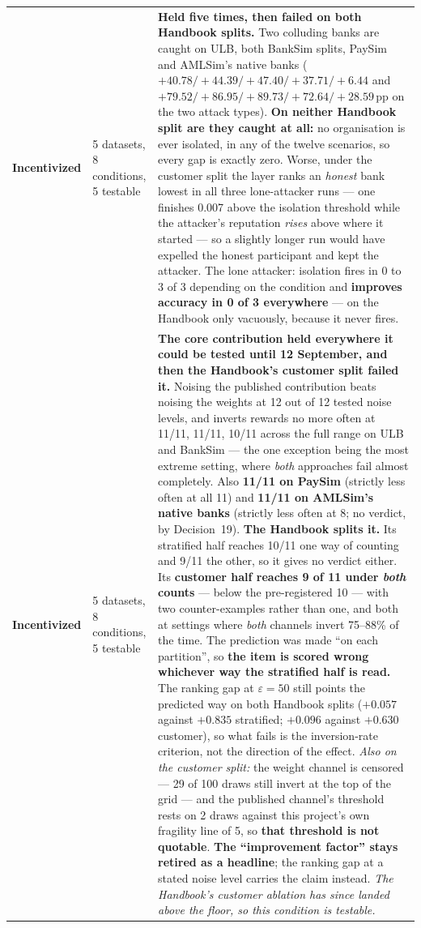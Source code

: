 \documentclass[11pt]{article}
\newcommand{\eps}{\ensuremath{\varepsilon}}
\begin{document}
{\begin{xltabular}{\linewidth}{@{}p{3.1cm} p{2.6cm} X@{}}
\textbf{Incentivized}  & 5 datasets, 8 conditions, 5 testable & \textbf{Held five times, then failed on both Handbook splits.} Two colluding banks are caught on ULB, both BankSim splits, PaySim and AMLSim's native banks ($+40.78/+44.39/+47.40/+37.71/+6.44$ and $+79.52/+86.95/+89.73/+72.64/+28.59$\,pp on the two attack types). \textbf{On neither Handbook split are they caught at all:} no organisation is ever isolated, in any of the twelve scenarios, so every gap is exactly zero. Worse, under the customer split the layer ranks an \emph{honest} bank lowest in all three lone-attacker runs --- one finishes 0.007 above the isolation threshold while the attacker's reputation \emph{rises} above where it started --- so a slightly longer run would have expelled the honest participant and kept the attacker. The lone attacker: isolation fires in 0 to 3 of 3 depending on the condition and \textbf{improves accuracy in 0 of 3 everywhere} --- on the Handbook only vacuously, because it never fires. \\
\textbf{Incentivized}  & 5 datasets, 8 conditions, 5 testable & \textbf{The core contribution held everywhere it could be tested until 12 September, and then the Handbook's customer split failed it.} Noising the published contribution beats noising the weights at 12 out of 12 tested noise levels, and inverts rewards no more often at 11/11, 11/11, 10/11 across the full range on ULB and BankSim --- the one exception being the most extreme setting, where \emph{both} approaches fail almost completely. Also \textbf{11/11 on PaySim} (strictly less often at all 11) and \textbf{11/11 on AMLSim's native banks} (strictly less often at 8; no verdict, by Decision~19). \textbf{The Handbook splits it.} Its stratified half reaches 10/11 one way of counting and 9/11 the other, so it gives no verdict either. Its \textbf{customer half reaches 9 of 11 under \emph{both} counts} --- below the pre-registered 10 --- with two counter-examples rather than one, and both at settings where \emph{both} channels invert 75--88\% of the time. The prediction was made ``on each partition'', so \textbf{the item is scored wrong whichever way the stratified half is read.} The ranking gap at $\eps = 50$ still points the predicted way on both Handbook splits ($+0.057$ against $+0.835$ stratified; $+0.096$ against $+0.630$ customer), so what fails is the inversion-rate criterion, not the direction of the effect. \emph{Also on the customer split:} the weight channel is censored --- 29 of 100 draws still invert at the top of the grid --- and the published channel's threshold rests on 2 draws against this project's own fragility line of 5, so \textbf{that threshold is not quotable}. \textbf{The ``improvement factor'' stays retired as a headline}; the ranking gap at a stated noise level carries the claim instead. \emph{The Handbook's customer ablation has since landed above the floor, so this condition is testable.} \\

\end{xltabular}}
\end{document}
